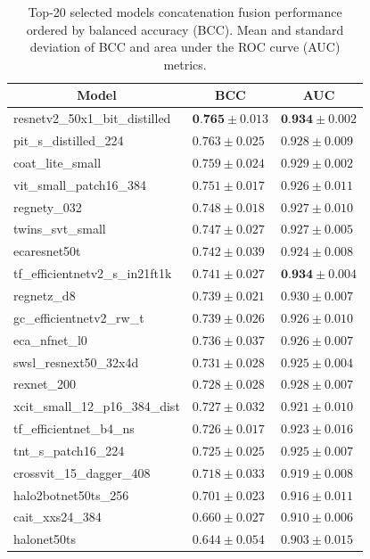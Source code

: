 \documentclass[conference]{IEEEtran}
\begin{document}
\begin{table}
\centering
\caption{Top-20 selected models concatenation fusion performance ordered by balanced accuracy (BCC). Mean and standard deviation of BCC and area under the ROC curve (AUC) metrics.}
\label{table:top20_result}
\begin{tabular}{l|ll} 
\toprule
\multicolumn{1}{c|}{\textbf{Model}} & \multicolumn{1}{c}{\textbf{BCC}}   & \multicolumn{1}{c}{\textbf{AUC}}    \\ 
\hline
resnetv2\_50x1\_bit\_distilled      & $\textbf{0.765} \pm 0.013$ & $\textbf{0.934} \pm 0.002$  \\
pit\_s\_distilled\_224              & $0.763 \pm 0.025$ & $0.928 \pm 0.009$  \\
coat\_lite\_small                   & $0.759 \pm 0.024$ & $0.929 \pm 0.002$  \\
vit\_small\_patch16\_384            & $0.751 \pm 0.017$ & $0.926 \pm 0.011$  \\
regnety\_032                        & $0.748 \pm 0.018$ & $0.927 \pm 0.010$  \\ 
\hline
twins\_svt\_small                   & $0.747 \pm 0.027$ & $0.927 \pm 0.005$  \\
ecaresnet50t                        & $0.742 \pm 0.039$ & $0.924 \pm 0.008$  \\
tf\_efficientnetv2\_s\_in21ft1k     & $0.741 \pm 0.027$ & $\textbf{0.934} \pm 0.004$  \\
regnetz\_d8                         & $0.739 \pm 0.021$ & $0.930 \pm 0.007$  \\
gc\_efficientnetv2\_rw\_t           & $0.739 \pm 0.026$ & $0.926 \pm 0.010$  \\
eca\_nfnet\_l0                      & $0.736 \pm 0.037$ & $0.926 \pm 0.007$  \\
swsl\_resnext50\_32x4d              & $0.731 \pm 0.028$ & $0.925 \pm 0.004$  \\
rexnet\_200                         & $0.728 \pm 0.028$ & $0.928 \pm 0.007$  \\
xcit\_small\_12\_p16\_384\_dist     & $0.727 \pm 0.032$ & $0.921 \pm 0.010$  \\
tf\_efficientnet\_b4\_ns            & $0.726 \pm 0.017$ & $0.923 \pm 0.016$  \\
tnt\_s\_patch16\_224                & $0.725 \pm 0.025$ & $0.925 \pm 0.007$  \\
crossvit\_15\_dagger\_408           & $0.718 \pm 0.033$ & $0.919 \pm 0.008$  \\
halo2botnet50ts\_256                & $0.701 \pm 0.023$ & $0.916 \pm 0.011$  \\
cait\_xxs24\_384                    & $0.660 \pm 0.027$ & $0.910 \pm 0.006$  \\
halonet50ts                         & $0.644 \pm 0.054$ & $0.903 \pm 0.015$  \\
\bottomrule
\end{tabular}
\end{table}
\end{document}
